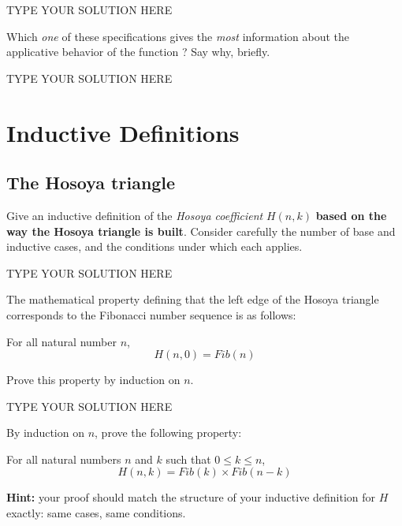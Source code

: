\documentclass[11pt]{article}
\begin{document}
\begin{solution}
TYPE YOUR SOLUTION HERE
\end{solution}


\begin{task}{2} %
Which \emph{one} of these specifications gives the \emph{most} information
about the applicative behavior of the function ? Say
why, briefly.
\end{task}

\begin{solution}
TYPE YOUR SOLUTION HERE
\end{solution}


\section{Inductive Definitions}

\subsection{The Hosoya triangle}

\begin{task}{8} %
Give an inductive definition of the \emph{Hosoya coefficient} $H(n,k)$
\textbf{based on the way the Hosoya triangle is built}.  Consider carefully
the number of base and inductive cases, and the conditions under which each
applies.
\end{task}

\begin{solution}
TYPE YOUR SOLUTION HERE
\end{solution}


\begin{task}{5} %
The mathematical property defining that the left edge of the Hosoya triangle
corresponds to the Fibonacci number sequence is as follows:

\begin{property}
\label{prop:left-edge}
For all natural number $n$,
$$
H(n,0) = Fib(n)
$$
\end{property}
Prove this property by induction on $n$.
\end{task}

\begin{solution}
TYPE YOUR SOLUTION HERE
\end{solution}


\begin{task}{10} %
By induction on $n$, prove the following property:

\begin{property}
\label{prop:h-fib}
  For all natural numbers $n$ and $k$ such that $0 \leq k \leq n$,
  $$
  H(n,k) = Fib(k) \times Fib(n-k)
  $$
\end{property}
\textbf{Hint:} your  proof should match the structure of your inductive
definition for $H$ exactly: same cases, same conditions.
\end{task}
\end{document}
